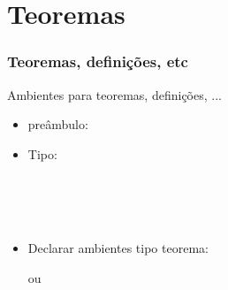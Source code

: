 
\section{Teoremas}

\begin{frame}
  \frametitle{Teoremas, definições, etc}

  \begin{block}{Ambientes para teoremas, definições, ...}

    \begin{itemize}
    \item preâmbulo:
      \texttt{\purple{\string\usepackage}}\medskip

    \item Tipo:

      \begin{ttfamily}\small
        \green{\string\theoremstyle}\ \ \ \ \\
        \green{\string\theoremstyle}\ \\
        \green{\string\theoremstyle}\ \ \ \ \ 
      \end{ttfamily}

    \item Declarar ambientes tipo teorema:\smallskip

      \texttt{\small\purple{\string\newtheorem}}
      
      ou

      \texttt{\small\purple{\string\newtheorem}}

    \end{itemize}
    
  \end{block}

\end{frame}

